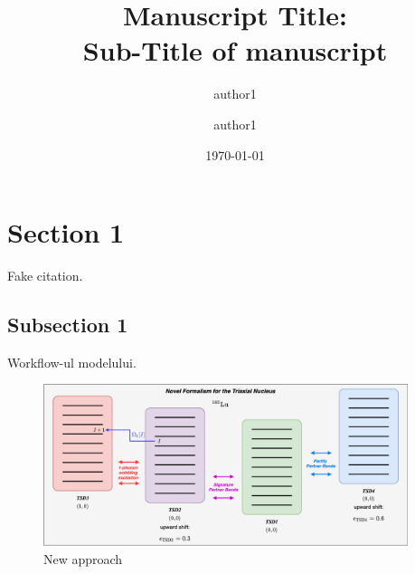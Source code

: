 \documentclass[%
preprint,
 amsmath,
 amssymb,
 aps,
]{revtex4-2}
\begin{document}
\title{Manuscript Title:\\Sub-Title of manuscript }%

\author{author1}%
\author{author1}%
%


\date{\today}

\begin{abstract}
\lipsum[1]
\end{abstract}

\maketitle


\section{Section 1}

\lipsum[1-4] Fake citation.

\subsection{Subsection 1}

\lipsum[1-4]

Workflow-ul modelului.

\begin{figure}[h]
    \centering
    \includegraphics[width=0.95\textwidth]{./images/diagrams/double_shift_fit_workflow.png}
    \caption{New approach}
    \label{fig:band-structure}
\end{figure}



\end{document}

